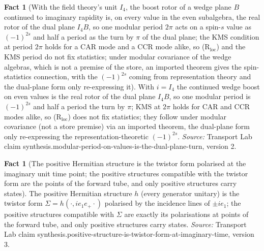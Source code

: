 \documentclass[11pt]{article}
\theoremstyle{definition}
\newtheorem{fact}[theorem]{Fact}
\theoremstyle{plain}
\begin{document}
\begin{fact}[With the field theory's unit $I_{4}$, the boost rotor of a wedge plane $B$ continued to imaginary rapidity is, on every value in the even subalgebra, the real rotor of the dual plane $I_{4}B$, so one modular period $2\pi$ acts on a spin-$s$ value as $(-1)^{2s}$ and half a period as the turn by $\pi$ of the dual plane; the KMS condition at period $2\pi$ holds for a CAR mode and a CCR mode alike, so (R$_{\mathrm{loc}}$) and the KMS period do not fix statistics; under modular covariance of the wedge algebras, which is not a premise of the store, an imported theorem gives the spin-statistics connection, with the $(-1)^{2s}$ coming from representation theory and the dual-plane form only re-expressing it]\label{c:synthesis.modular-period-on-values-is-the-dual-plane-turn}
With $i = I_{4}$ the continued wedge boost on even values is the real rotor of the dual plane $I_{4}B$, so one modular period is $(-1)^{2s}$ and half a period the turn by $\pi$; KMS at $2\pi$ holds for CAR and CCR modes alike, so (R$_{\mathrm{loc}}$) does not fix statistics; they follow under modular covariance (not a store premise) via an imported theorem, the dual-plane form only re-expressing the representation-theoretic $(-1)^{2s}$.
\emph{Source:} Transport Lab claim synthesis.modular-period-on-values-is-the-dual-plane-turn, version 2.
\end{fact}

\begin{fact}[The positive Hermitian structure is the twistor form polarised at the imaginary unit time point; the positive structures compatible with the twistor form are the points of the forward tube, and only positive structures carry states]\label{c:synthesis.positive-structure-is-twistor-form-at-imaginary-time}
The positive Hermitian structure $h$ (every generator unitary) is the twistor form $\Sigma = h(\cdot, ie_{1}e_{+}\cdot)$ polarised by the incidence lines of $\pm ie_{1}$; the positive structures compatible with $\Sigma$ are exactly its polarisations at points of the forward tube, and only positive structures carry states.
\emph{Source:} Transport Lab claim synthesis.positive-structure-is-twistor-form-at-imaginary-time, version 3.
\end{fact}
\end{document}
